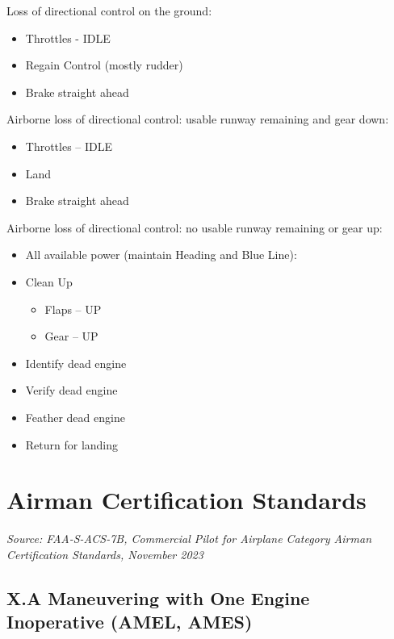 \bfseries{

Loss of directional control on the ground:
\begin{itemize}
    \item Throttles - IDLE
    \item Regain Control (mostly rudder)
    \item Brake straight ahead
\end{itemize}

Airborne loss of directional control: usable runway remaining and gear down:
\begin{itemize}
    \item Throttles – IDLE
    \item Land
    \item Brake straight ahead
\end{itemize}

Airborne loss of directional control: no usable runway remaining or gear up:
\begin{itemize}
    \item All available power (maintain Heading and Blue Line):
    \item Clean Up
        \begin{itemize}
            \item[\ding{226}] Flaps – UP
            \item[\ding{226}] Gear – UP
        \end{itemize}
    \item Identify dead engine
    \item Verify dead engine
    \item Feather dead engine
    \item Return for landing
\end{itemize}
\mdseries

\section{Airman Certification Standards}

\emph{Source: FAA-S-ACS-7B, Commercial Pilot for Airplane Category Airman Certification Standards, November 2023} 

\subsection{X.A Maneuvering with One Engine Inoperative (AMEL, AMES)}


}
